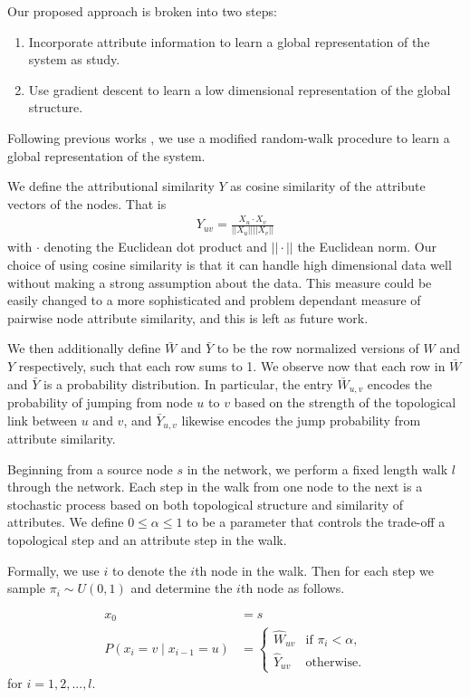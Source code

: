 \documentclass{article}
\begin{document}
Our proposed approach is broken into two steps: 
\begin{enumerate}
	\item Incorporate attribute information to learn a global representation of the system as study. 
	\item Use gradient descent to learn a low dimensional representation of the global structure.
\end{enumerate}

Following previous works \cite{grover2016node2vec}, we use a modified random-walk procedure to learn a global representation of the system. 

We define the attributional similarity $Y$ as cosine similarity of the attribute vectors of the nodes. That is 
\begin{align*}
Y_{uv} = \frac{X_u \cdot X_v}{||X_u||||X_v||}
\end{align*}
with $\cdot$ denoting the Euclidean dot product and $||\cdot||$ the Euclidean norm.
Our choice of using cosine similarity is that it can handle high dimensional data well without making a strong assumption about the data.
This measure could be easily changed to a more sophisticated and problem dependant measure of pairwise node attribute similarity, and this is left as future work. 

We then additionally define $\bar{W}$ and $\bar{Y}$ to be the row normalized versions of $W$ and $Y$ respectively, such that each row sums to 1. We observe now that each row in $\bar{W}$ and $\bar{Y}$ is a probability distribution. In particular, the entry $\bar{W}_{u,v}$ encodes the probability of jumping from node $u$ to $v$ based on the strength of the topological link between $u$ and $v$, and $\bar{Y}_{u,v}$ likewise encodes the jump probability from attribute similarity.

Beginning from a source node $s$ in the network, we perform a fixed length walk $l$ through the network. Each step in the walk from one node to the next is a stochastic process based on both topological structure and similarity of attributes. We define $0\leq\alpha\leq1$ to be a parameter that controls the trade-off a topological step and an attribute step in the walk. 

Formally, we use $i$ to denote the $i$th node in the walk. Then for each step we sample $\pi _i\sim U(0,1)$ and determine the $i$th node as follows.

\begin{align*}
x_0 &= s \\
P(x_i = v\mid x_{i-1} = u) &= 
\begin{cases}
\hat{W}_{uv} &\text{if }\pi_i < \alpha,\\
\hat{Y}_{uv} &\text{otherwise.}
\end{cases}
\end{align*}
for $i=1,2,...,l$.
\end{document}
